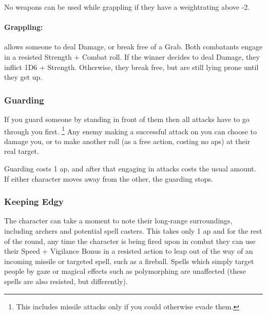 \begin{multicols}{2}
No weapons can be used while grappling if they have a \gls{weightrating} above -2.

\paragraph[Grapple: Make an opposted roll of Strength + Combat.  Success means the combatant can either break free or inflict Damage.  Cost: 3 \gls{ap}]{Grappling:}
allows someone to deal Damage, or break free of a Grab.
Both combatants engage in a resisted Strength + Combat roll.
If the winner decides to deal Damage, they inflict 1D6 + Strength.
Otherwise, they break free, but are still lying prone until they get up.
\label{grapple}

\subsubsection[Guard: Someone must successfully hit you before they are allowed to hit whomever you are guarding. Cost: 1 \gls{ap}]{Guarding}

If you guard someone by standing in front of them then all attacks have to go through you first.%
\footnote{This includes missile attacks only if you could otherwise evade them.}
Any enemy making a successful attack on you can choose to damage you, or to make another roll (as a free action, costing no \glspl{ap}) at their real target.

Guarding costs 1 \gls{ap}, and after that engaging in attacks costs the usual amount.
If either character moves away from the other, the guarding stops.

\subsubsection[Keep Edgy: Look out for missiles and resist them with Speed + Vigilance. Cost: 1 \gls{ap}]{Keeping Edgy}
\label{edgy}

The character can take a moment to note their long-range surroundings, including archers and potential spell casters.
This takes only 1 \gls{ap} and for the rest of the round, any time the character is being fired upon in combat they can use their Speed + Vigilance Bonus in a resisted action to leap out of the way of an incoming missile or targeted spell, such as a fireball.
Spells which simply target people by gaze or magical effects such as polymorphing are unaffected (these spells are also resisted, but differently).


\end{multicols}
